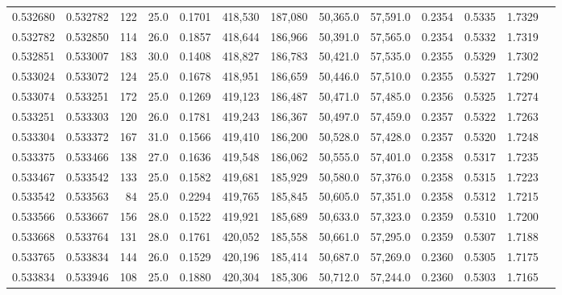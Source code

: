 \begin{tabular}{rrrrrrrrrrrrr}
0.532680 & 0.532782 &   122 & 25.0 &                                     0.1701 & 418,530 & 187,080 &  50,365.0 &  57,591.0 & 0.2354 & 0.5335 & 1.7329 \\
0.532782 & 0.532850 &   114 & 26.0 &                                     0.1857 & 418,644 & 186,966 &  50,391.0 &  57,565.0 & 0.2354 & 0.5332 & 1.7319 \\
0.532851 & 0.533007 &   183 & 30.0 &                                     0.1408 & 418,827 & 186,783 &  50,421.0 &  57,535.0 & 0.2355 & 0.5329 & 1.7302 \\
0.533024 & 0.533072 &   124 & 25.0 &                                     0.1678 & 418,951 & 186,659 &  50,446.0 &  57,510.0 & 0.2355 & 0.5327 & 1.7290 \\
0.533074 & 0.533251 &   172 & 25.0 &                                     0.1269 & 419,123 & 186,487 &  50,471.0 &  57,485.0 & 0.2356 & 0.5325 & 1.7274 \\
0.533251 & 0.533303 &   120 & 26.0 &                                     0.1781 & 419,243 & 186,367 &  50,497.0 &  57,459.0 & 0.2357 & 0.5322 & 1.7263 \\
0.533304 & 0.533372 &   167 & 31.0 &                                     0.1566 & 419,410 & 186,200 &  50,528.0 &  57,428.0 & 0.2357 & 0.5320 & 1.7248 \\
0.533375 & 0.533466 &   138 & 27.0 &                                     0.1636 & 419,548 & 186,062 &  50,555.0 &  57,401.0 & 0.2358 & 0.5317 & 1.7235 \\
0.533467 & 0.533542 &   133 & 25.0 &                                     0.1582 & 419,681 & 185,929 &  50,580.0 &  57,376.0 & 0.2358 & 0.5315 & 1.7223 \\
0.533542 & 0.533563 &    84 & 25.0 &                                     0.2294 & 419,765 & 185,845 &  50,605.0 &  57,351.0 & 0.2358 & 0.5312 & 1.7215 \\
0.533566 & 0.533667 &   156 & 28.0 &                                     0.1522 & 419,921 & 185,689 &  50,633.0 &  57,323.0 & 0.2359 & 0.5310 & 1.7200 \\
0.533668 & 0.533764 &   131 & 28.0 &                                     0.1761 & 420,052 & 185,558 &  50,661.0 &  57,295.0 & 0.2359 & 0.5307 & 1.7188 \\
0.533765 & 0.533834 &   144 & 26.0 &                                     0.1529 & 420,196 & 185,414 &  50,687.0 &  57,269.0 & 0.2360 & 0.5305 & 1.7175 \\
0.533834 & 0.533946 &   108 & 25.0 &                                     0.1880 & 420,304 & 185,306 &  50,712.0 &  57,244.0 & 0.2360 & 0.5303 & 1.7165 \\

\end{tabular}

